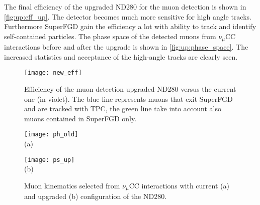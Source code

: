 \documentclass[main.tex]{subfiles}
\begin{document}
The final efficiency of the upgraded ND280 for the muon detection is shown in \autoref{fig:up:eff_up}. The detector becomes much more sensitive for high angle tracks. Furthermore SuperFGD gain the efficiency a lot with ability to track and identify self-contained particles. The phase space of the detected muons from $\nu_\mu$CC interactions before and after the upgrade is shown in \autoref{fig:up:phase_space}. The increased statistics and acceptance of the high-angle tracks are clearly seen.

\begin{figure}[!ht]
  \centering
  \texttt{[image: new\_eff]}
  \caption{Efficiency of the muon detection upgraded ND280 versus the current one (in violet). The blue line represents muons that exit SuperFGD and are tracked with TPC, the green line take into account also muons contained in SuperFGD only.}
  \label{fig:up:eff_up}
\end{figure}

\begin{figure}[!ht]
  \centering
  \begin{minipage}{0.49\linewidth}
    \centering
    \texttt{[image: ph\_old]} \\ (a)
  \end{minipage}
  \begin{minipage}{0.49\linewidth}
    \centering
    \texttt{[image: ps\_up]} \\ (b)
  \end{minipage}
    \caption{Muon kinematics selected from $\nu_\mu$CC interactions with current (a) and upgraded (b) configuration of the ND280.}
    \label{fig:up:phase_space}
\end{figure}
\end{document}
